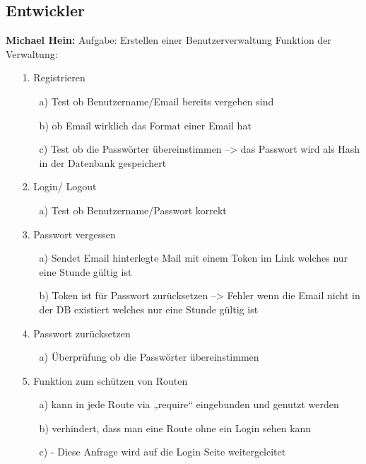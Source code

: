 \documentclass[12pt,a4paper]{article}
\begin{document}
\subsection{Entwickler}
\textbf{Michael Hein:}
\newline
Aufgabe: Erstellen einer Benutzerverwaltung
\newline
Funktion der Verwaltung:
\begin{itemize}
\item[1.]Registrieren
\begin{itemize}
        \item[a)]Test ob Benutzername/Email bereits vergeben sind
        \item[b)] ob Email wirklich das Format einer Email hat
        \item[c)]Test ob die Passwörter übereinstimmen --> das Passwort wird als Hash in der  Datenbank gespeichert
\end{itemize}
\item[2.]Login/ Logout
\begin{itemize}
\item[a)]Test ob Benutzername/Passwort korrekt
\end{itemize}
\item[3.]Passwort vergessen 
\begin{itemize}
 \item[a)] Sendet Email hinterlegte Mail mit einem Token im Link welches nur eine Stunde gültig ist
\item[b)]Token ist für Passwort zurücksetzen --> Fehler wenn die Email nicht in der DB existiert welches nur eine Stunde gültig ist
\end{itemize}
\item[4.]Passwort zurücksetzen
\begin{itemize}
\item[a)]Überprüfung ob die Passwörter übereinstimmen
\end{itemize}
\item[5.]Funktion zum schützen von Routen
\begin{itemize}
\item[a)]kann in jede Route via „require“ eingebunden und genutzt werden
\item[b)]verhindert, dass man eine Route ohne ein Login sehen kann
 \item[c)]- Diese Anfrage wird auf die Login Seite weitergeleitet
\end{itemize}
\end{itemize}
\end{document}
